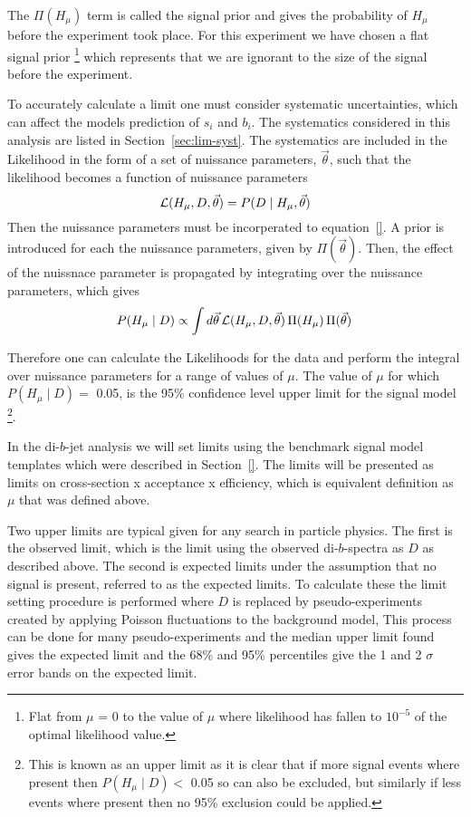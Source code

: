 The $\Pi( H_\mu )$ term  is called the signal prior
and gives the probability of $H_\mu$ before the experiment took place.
For this experiment we have chosen a flat signal prior
\footnote{Flat from $\mu$ = 0 to the value of $\mu$ where
likelihood has fallen to $10^{-5}$ of the optimal likelihood value.}
which represents that we are ignorant to the size of the signal before the experiment.

To accurately calculate a limit one must consider systematic uncertainties,
which can affect the models prediction of $s_i$ and $b_i$.
The systematics considered in this analysis are listed in Section~\ref{sec:lim-syst}.
The systematics are included in the Likelihood in the form of a set of nuissance parameters, $\vec{\theta}$,
such that the likelihood becomes a function of nuissance parameters
\begin{equation}
  \mathcal{L} (H_\mu,D,\vec{\theta}) = P(D \mid H_\mu, \vec{\theta} ) 
\end{equation}
Then the nuissance parameters must be incorperated to equation~\ref{}.
A prior is introduced for each the nuissance parameters, given by $\Pi(\vec{\theta})$.
Then, the effect of the nuissnace parameter is propagated by integrating over
the nuissance parameters, which gives
\begin{equation}
  P(H_\mu \mid D) \propto \int d \vec{\theta} \, \mathcal{L} (H_\mu, D, \vec{\theta} ) \, \Pi( H_\mu )  \, \Pi(\vec{\theta}) \, 
\end{equation}

Therefore one can calculate the Likelihoods for the data and
perform the integral over nuissance parameters for a range of values of $\mu$.
The value of $\mu$ for which  $P(H_\mu \mid D) =$ 0.05,
is the 95\% confidence level upper limit for the signal model
\footnote{ This is known as an upper limit as it is clear that if more signal events where present
  then $P(H_\mu \mid D) <$ 0.05 so can also be excluded,
  but similarly if less events where present then no 95\% exclusion could be applied.}.

In the di-$b$-jet analysis we will set limits using the benchmark signal model templates which were described in Section~\ref{}.
The limits will be presented as limits on cross-section x acceptance x efficiency,
which is equivalent definition as $\mu$ that was defined above.

Two upper limits are typical given for any search in particle physics.
The first is the observed limit, which is the limit using the observed di-$b$-spectra
as $D$ as described above.
The second is expected limits under the assumption that no signal is present, referred to as the expected limits.
To calculate these the limit setting procedure is performed where $D$ is replaced by pseudo-experiments created by applying Poisson fluctuations to the background model,
This process can be done for many pseudo-experiments and the median upper limit  found gives the expected limit
and the 68\% and 95\% percentiles give the 1 and 2 $\sigma$ error bands on the expected limit.





